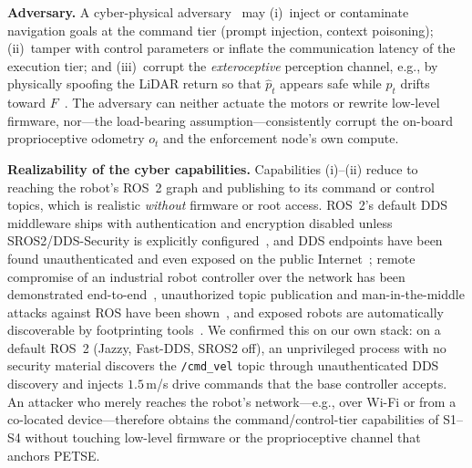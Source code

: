 \documentclass[conference]{IEEEtran}
\begin{document}
\textbf{Adversary.} A cyber-physical adversary~\cite{yaacoub2022robotics}
may (i)~inject or contaminate navigation goals at the command tier
(prompt injection, context poisoning); (ii)~tamper with control
parameters or inflate the communication latency of the execution tier;
and (iii)~corrupt the \emph{exteroceptive} perception channel, e.g., by
physically spoofing the LiDAR return so that $\hat{p}_t$ appears safe
while $p_t$ drifts toward $F$~\cite{cao2019adversarial,sun2020towards}.
The adversary can neither actuate the motors or rewrite low-level
firmware, nor---the load-bearing assumption---consistently corrupt the
on-board proprioceptive odometry $o_t$ and the enforcement node's own
compute.

\textbf{Realizability of the cyber capabilities.} Capabilities (i)--(ii)
reduce to reaching the robot's ROS~2 graph and publishing to its command
or control topics, which is realistic \emph{without} firmware or root
access. ROS~2's default DDS middleware ships with authentication and
encryption disabled unless SROS2/DDS-Security is explicitly
configured~\cite{mayoralvilches2022sros2,diluoffo2018ros2}, and DDS
endpoints have been found unauthenticated and even exposed on the public
Internet~\cite{maggi2022dds}; remote compromise of an industrial robot
controller over the network has been demonstrated
end-to-end~\cite{quarta2017experimental}, unauthorized topic publication
and man-in-the-middle attacks against ROS have been
shown~\cite{dieber2017security}, and exposed robots are automatically
discoverable by footprinting tools~\cite{mayoralvilches2018aztarna}. We
confirmed this on our own stack: on a default ROS~2 (Jazzy, Fast-DDS,
SROS2 off), an unprivileged process with no security material discovers
the \texttt{/cmd\_vel} topic through unauthenticated DDS discovery and
injects $1.5$\,m/s drive commands that the base controller accepts.
An attacker who merely reaches the robot's network---e.g., over Wi-Fi or
from a co-located device---therefore obtains the command/control-tier
capabilities of S1--S4 without touching low-level firmware or the
proprioceptive channel that anchors PETSE.
\end{document}
